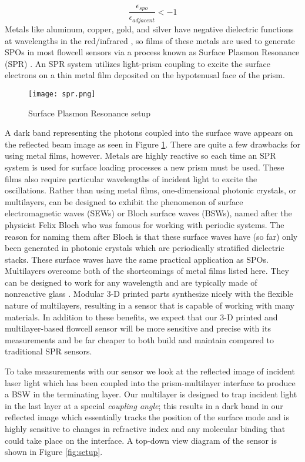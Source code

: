 \begin{flushleft}
	\[
		\frac{\epsilon_{spo}}{\epsilon_{adjacent}} < -1
	\]
	\hspace{0.25in}
	Metals like aluminum, copper, gold, and silver have negative dielectric functions at wavelengths in the red/infrared \cite{JLTROB:1}, so films of these metals are used to generate SPOs in most flowcell sensors via a process known as Surface Plasmon Resonance (SPR) \cite{homola1999surface}. An SPR system utilizes light-prism coupling to excite the surface electrons on a thin metal film deposited on the hypotenusal face of the prism.
	\begin{figure}[h]
		\begin{center}
			\texttt{[image: spr.png]}
			\caption{Surface Plasmon Resonance setup}
			\label{fig:SPR}
		\end{center}
	\end{figure}
	A dark band representing the photons coupled into the surface wave appears on the reflected beam image as seen in Figure \ref{fig:SPR}. There are quite a few drawbacks for using metal films, however. Metals are highly reactive so each time an SPR system is used for surface loading processes a new prism must be used. These films also require particular wavelengths of incident light to excite the oscillations. Rather than using metal films, one-dimensional photonic crystals, or multilayers, can be designed to exhibit the phenomenon of surface electromagnetic waves (SEWs) or Bloch surface waves (BSWs), named after the physicist Felix Bloch who was famous for working with periodic systems. The reason for naming them after Bloch is that these surface waves have (so far) only been generated in photonic crystals which are periodically stratified dielectric stacks. These surface waves have the same practical application as SPOs. Multilayers overcome both of the shortcomings of metal films listed here. They can be designed to work for any wavelength and are typically made of nonreactive glass \cite{JLTROB:1}. Modular 3-D printed parts synthesize nicely with the flexible nature of multilayers, resulting in a sensor that is capable of working with many materials. In addition to these benefits, we expect that our 3-D printed and multilayer-based flowcell sensor will be more sensitive and precise with its measurements \cite{farmer2012biosensing} and be far cheaper to both build and maintain compared to traditional SPR sensors.

	\hspace{0.25in}
	To take measurements with our sensor we look at the reflected image of incident laser light which has been coupled into the prism-multilayer interface to produce a BSW in the terminating layer. Our multilayer is designed to trap incident light in the last layer at a special \textit{coupling angle}; this results in a dark band in our reflected image which essentially tracks the position of the surface mode and is highly sensitive to changes in refractive index and any molecular binding that could take place on the interface. A top-down view diagram of the sensor is shown in Figure \ref{fig:setup}.


\end{flushleft}
